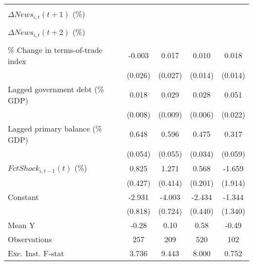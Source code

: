 {\begin{tabular}{l*{4}{c}}
                    &                     &                     &                     &                     \\
\addlinespace
$ \Delta News_{i,t}(t+1)$ (\%)&                     &                     &                     &                     \\
                    &                     &                     &                     &                     \\
\addlinespace
$ \Delta News_{i,t}(t+2)$ (\%)&                     &                     &                     &                     \\
                    &                     &                     &                     &                     \\
\addlinespace
\% Change in terms-of-trade index&      -0.003         &       0.017         &       0.010         &       0.018         \\
                    &     (0.026)         &     (0.027)         &     (0.014)         &     (0.014)         \\
\addlinespace
Lagged government debt (\% GDP)&       0.018\sym{**} &       0.029\sym{***}&       0.028\sym{***}&       0.051\sym{**} \\
                    &     (0.008)         &     (0.009)         &     (0.006)         &     (0.022)         \\
\addlinespace
Lagged primary balance (\% GDP)&       0.648\sym{***}&       0.596\sym{***}&       0.475\sym{***}&       0.317\sym{***}\\
                    &     (0.054)         &     (0.055)         &     (0.034)         &     (0.059)         \\
\addlinespace
$ FctShock_{i,t-1}(t)$ (\%)&       0.825\sym{*}  &       1.271\sym{**} &       0.568\sym{***}&      -1.659         \\
                    &     (0.427)         &     (0.414)         &     (0.201)         &     (1.914)         \\
\addlinespace
Constant            &      -2.931\sym{***}&      -4.003\sym{***}&      -2.434\sym{***}&      -1.344         \\
                    &     (0.818)         &     (0.724)         &     (0.440)         &     (1.340)         \\
\midrule
Mean Y              &       -0.28         &        0.10         &        0.58         &       -0.49         \\
Observations        &         257         &         209         &         520         &         102         \\
Exc. Inst. F-stat   &       3.736         &       9.443         &       8.000         &       0.752         \\
\bottomrule
\end{tabular}
}
